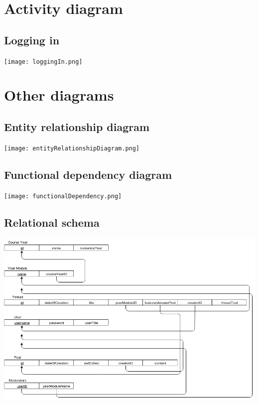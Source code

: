 \documentclass[a4paper, 12pt]{article}
\begin{document}
	\section{Activity diagram}
		\subsection{Logging in}
			\texttt{[image: loggingIn.png]}
	\section{Other diagrams}
		\subsection{Entity relationship diagram}
			\texttt{[image: entityRelationshipDiagram.png]}
		\subsection{Functional dependency diagram}
			\texttt{[image: functionalDependency.png]}
		\subsection{Relational schema}
			\includegraphics[width=\textwidth]{relationalSchema.png}

			
\end{document}
